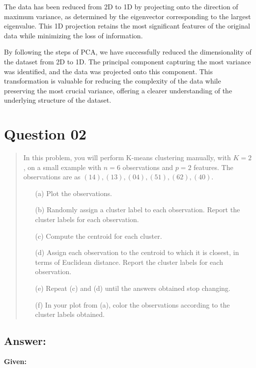 \documentclass{exam}
\begin{document}
The data has been reduced from 2D to 1D by projecting onto the direction of maximum variance, as determined by the eigenvector corresponding to the largest eigenvalue. This 1D projection retains the most significant features of the original data while minimizing the loss of information.

By following the steps of PCA, we have successfully reduced the dimensionality of the dataset from 2D to 1D. The principal component capturing the most variance was identified, and the data was projected onto this component. This transformation is valuable for reducing the complexity of the data while preserving the most crucial variance, offering a clearer understanding of the underlying structure of the dataset.



\section{Question 02}

\begin{quote}
In this problem, you will perform K-means clustering manually, with \( K = 2 \), on a small example with \( n = 6 \) observations and \( p = 2 \) features. The observations are as \( (14), (13), (04), (51), (62), (40) \).

\begin{itemize}
\item[(a)] Plot the observations.
\item[(b)] Randomly assign a cluster label to each observation. Report the cluster labels for each observation.
\item[(c)] Compute the centroid for each cluster.
\item[(d)] Assign each observation to the centroid to which it is closest, in terms of Euclidean distance. Report the cluster labels for each observation.
\item[(e)] Repeat (c) and (d) until the answers obtained stop changing.
\item[(f)] In your plot from (a), color the observations according to the cluster labels obtained.
\end{itemize}
\end{quote}

\subsection{Answer:}

\textbf{Given:}
\end{document}
